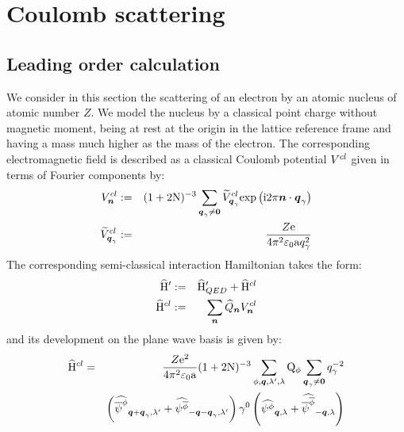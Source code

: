 \documentclass[10pt,a4paper,twoside,openany]{book}
\begin{document}

\chapter{Coulomb scattering}
\label{Coulomb scattering}


\section{Leading order calculation}

We consider in this section the scattering of an electron by an atomic nucleus of atomic number $Z$. We model the nucleus by a classical point charge without magnetic moment, being at rest at the origin in the lattice reference frame and having a mass much higher as the mass of the electron. The corresponding electromagnetic field is described as a classical Coulomb potential $V^{cl}$ given in terms of Fourier components by:
\begin{eqnarray*}
V^{cl}_{\boldsymbol{n}} & := & ( 1 + 2 \mathrm N )^{-3} \sum_{\boldsymbol{q}_\gamma \neq \boldsymbol{0}} \widetilde{V}^{cl}_{\boldsymbol{q}_\gamma} \mathrm{exp} \left( {\mathrm{i} 2 \pi \boldsymbol{n} \cdot \boldsymbol{q}_\gamma} \right) \\
\widetilde{V}^{cl}_{\boldsymbol{q}_\gamma} & := & \frac{Z \mathrm e}{4 \pi^2 \mathrm \varepsilon_0 \mathrm a q_\gamma^2}
\end{eqnarray*}
The corresponding semi-classical interaction Hamiltonian takes the form:
\begin{eqnarray*}
\widehat{\mathrm H}' & := & \widehat{\mathrm H}'_{QED} + \widehat{\mathrm H}^{cl} \\
\widehat{\mathrm H}^{cl} & := & \sum_{\boldsymbol{n}} \widehat{Q}_{\boldsymbol{n}} V^{cl}_{\boldsymbol{n}}
\end{eqnarray*}
and its development on the plane wave basis is given by:
\begin{eqnarray*}
\widehat{\mathrm H}^{cl} & = & \frac{Z \mathrm e^2}{4 \pi^2 \mathrm \varepsilon_0 \mathrm a} ( 1 + 2 \mathrm N )^{-3} \sum_{\phi, \boldsymbol{q}, \lambda', \lambda} \mathrm Q_{\phi} \sum_{\boldsymbol{q}_\gamma \neq \boldsymbol{0}} q_\gamma^{-2} \\
&& \left( \widehat{\overline \psi^{\phi}}_{{\boldsymbol{q} + \boldsymbol{q}_\gamma}, {\lambda'}} + \widehat{\psi^{\overline{\phi}}}_{{-\boldsymbol{q} - \boldsymbol{q}_\gamma}, {\lambda'}} \right) \gamma^{0} \left( \widehat{\psi^{\phi}}_{{\boldsymbol{q}}, {\lambda}} + \widehat{\overline \psi^{\overline{\phi}}}_{{-\boldsymbol{q}}, {\lambda}} \right)
\end{eqnarray*}
\end{document}
